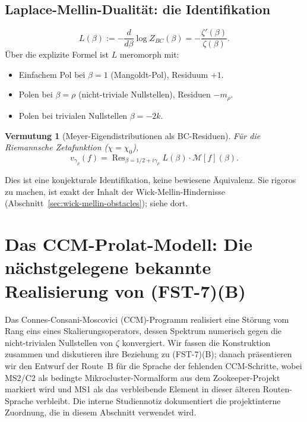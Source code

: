 \documentclass[11pt,a4paper]{article}
\theoremstyle{plain}
\newtheorem{conjecture}[theorem]{Vermutung}
\theoremstyle{definition}
\DeclareMathOperator{\Res}{Res}
\newcommand{\chifn}{\chi}
\begin{document}
\subsection{Laplace-Mellin-Dualität: die Identifikation}

\begin{equation}
\label{eq:log-z-deriv}
  L(\beta) := -\frac{d}{d\beta} \log Z_{BC}(\beta)
    = -\frac{\zeta'(\beta)}{\zeta(\beta)}.
\end{equation}
Über die explizite Formel ist $L$ meromorph mit:
\begin{itemize}
  \item Einfachem Pol bei $\beta = 1$ (Mangoldt-Pol), Residuum $+1$.
  \item Polen bei $\beta = \rho$ (nicht-triviale Nullstellen), Residuen $-m_\rho$.
  \item Polen bei trivialen Nullstellen $\beta = -2k$.
\end{itemize}

\begin{conjecture}[Meyer-Eigendistributionen als BC-Residuen]
\label{conj:meyer-bc}
Für die Riemannsche Zetafunktion ($\chifn = \chifn_0$),
\[
  v_{\gamma_\rho}(f) = \Res_{\beta = 1/2 + i\gamma_\rho}
    L(\beta) \cdot \mathcal M[f](\beta).
\]
\end{conjecture}

Dies ist eine konjekturale Identifikation, keine bewiesene Äquivalenz.
Sie rigoros zu machen, ist exakt der Inhalt der Wick-Mellin-Hindernisse
(Abschnitt~\ref{sec:wick-mellin-obstacles}); siehe dort.

\section{Das CCM-Prolat-Modell: Die nächstgelegene bekannte Realisierung von (FST-7)(B)}
\label{sec:ccm-prolate}

Das Connes-Consani-Moscovici (CCM)-Programm
\cite{ConnesConsani2023,ConnesMoscovici2022,ConnesConsaniMoscovici2025}
realisiert eine Störung vom Rang eins eines Skalierungsoperators,
dessen Spektrum numerisch gegen die nicht-trivialen Nullstellen von $\zeta$
konvergiert. Wir fassen die Konstruktion zusammen und diskutieren ihre
Beziehung zu (FST-7)(B); danach präsentieren wir den Entwurf der Route~B
für die Sprache der fehlenden CCM-Schritte, wobei MS2/C2 als bedingte
Mikrocluster-Normalform aus dem Zookeeper-Projekt markiert wird und MS1 als
das verbleibende Element in dieser älteren Routen-Sprache verbleibt. Die
interne Studiennotiz \cite{CCMStudy} dokumentiert die projektinterne
Zuordnung, die in diesem Abschnitt verwendet wird.
\end{document}

